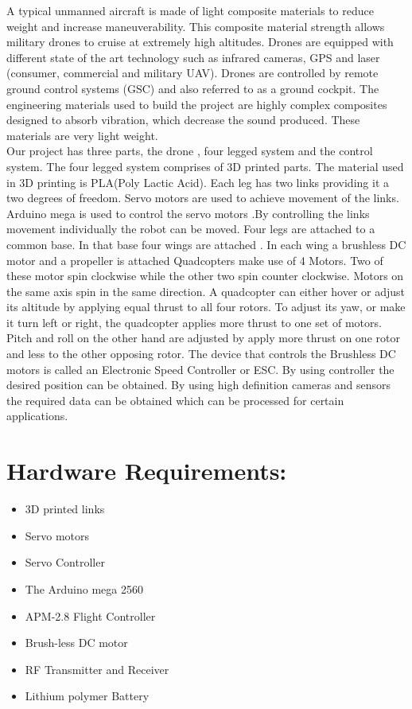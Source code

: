 \documentclass{article}
\begin{document}
\begin{normalsize}
      A typical unmanned aircraft is made of light composite materials to reduce weight and increase maneuverability. This composite material strength allows military drones to cruise at extremely high altitudes. Drones are equipped with different state of the art technology such as infrared cameras, GPS and laser (consumer, commercial and military UAV). Drones are controlled by remote ground control systems (GSC) and also referred to as a ground cockpit. The engineering materials used to build the project are highly complex composites designed to absorb vibration, which decrease the sound produced. These materials are very light weight.  \\
      Our project has three parts, the drone , four legged system and the control system. The four legged system comprises of 3D printed parts. The material used in 3D printing is PLA(Poly Lactic Acid). Each leg has two links providing it a two degrees of freedom. Servo motors are used to achieve movement of the links. Arduino mega is used to control the servo motors .By controlling the links movement individually the robot can be moved. Four legs are attached to a common base. In that base four wings are attached . In each wing a brushless DC motor and a propeller is attached Quadcopters make use of 4 Motors. Two of these motor spin clockwise while the other two spin counter clockwise. Motors on the same axis spin in the same direction.  A quadcopter can either hover or adjust its altitude by applying equal thrust to all four rotors. To adjust its yaw, or make it turn left or right, the quadcopter applies more thrust to one set of motors. Pitch and roll on the other hand are adjusted by apply more thrust on one rotor and less to the other opposing rotor. The device that controls the Brushless DC motors is called an Electronic Speed Controller or ESC. By using controller the desired position can be obtained. By using high definition cameras and sensors the required data can be obtained which can be processed for certain applications. \\
        
    	\section*{Hardware Requirements:}
        \begin{itemize}
        
\item 3D printed links
\item Servo motors
\item Servo Controller
\item The Arduino mega 2560
\item APM-2.8 Flight Controller
\item Brush-less DC motor
\item RF Transmitter and Receiver
\item Lithium polymer Battery


\end{itemize}
\end{normalsize}
\end{document}
